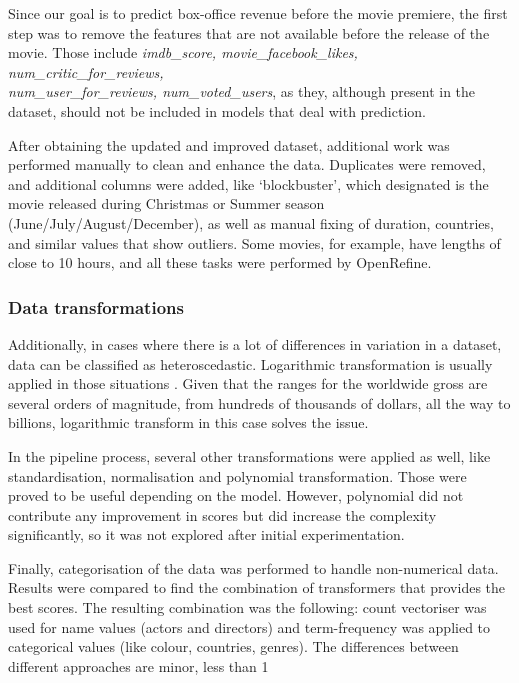 Since our goal is to predict box-office revenue before the movie premiere, the first step was to remove the features that are not available before the release of the movie. Those include \textit{imdb\_score, movie\_facebook\_likes, num\_critic\_for\_reviews, \\num\_user\_for\_reviews, num\_voted\_users}, as they, although present in the dataset, should not be included in models that deal with prediction.

After obtaining the updated and improved dataset, additional work was performed manually to clean and enhance the data. Duplicates were removed, and additional columns were added, like ‘blockbuster’, which designated is the movie released during Christmas or Summer season (June/July/August/December), as well as manual fixing of duration, countries, and similar values that show outliers. Some movies, for example, have lengths of close to 10 hours, and all these tasks were performed by OpenRefine.

\subsubsection{Data transformations}
Additionally, in cases where there is a lot of differences in variation in a dataset, data can be classified as heteroscedastic. Logarithmic transformation is usually applied in those situations \cite{kvalheim1994preprocessing}. Given that the ranges for the worldwide gross are several orders of magnitude, from hundreds of thousands of dollars, all the way to billions, logarithmic transform in this case solves the issue.

In the pipeline process, several other transformations were applied as well, like standardisation, normalisation and polynomial transformation. Those were proved to be useful depending on the model. However, polynomial did not contribute any improvement in scores but did increase the complexity significantly, so it was not explored after initial experimentation.

Finally, categorisation of the data was performed to handle non-numerical data. Results were compared to find the combination of transformers that provides the best scores. The resulting combination was the following: count vectoriser was used for name values (actors and directors) and term-frequency was applied to categorical values (like colour, countries, genres). The differences between different approaches are minor, less than 1%


